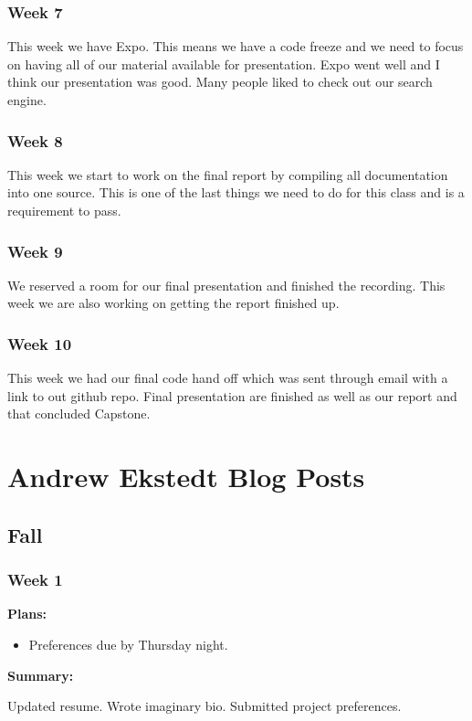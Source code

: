 \subsubsection{Week 7}
This week we have Expo. This means we have a code freeze and we need to focus on having all of our material available for presentation. Expo went well and I think our presentation was good. Many people liked to check out our search engine.
\subsubsection{Week 8}
This week we start to work on the final report by compiling all documentation into one source. This is one of the last things we need to do for this class and is a requirement to pass.
\subsubsection{Week 9}
We reserved a room for our final presentation and finished the recording. This week we are also working on getting the report finished up.
\subsubsection{Week 10}
This week we had our final code hand off which was sent through email with a link to out github repo. Final presentation are finished as well as our report and that concluded Capstone.
\section{ Andrew Ekstedt Blog Posts }

\subsection{Fall}

\subsubsection{Week 1}

\noindent \textbf{Plans:}
\begin{itemize}
\item Preferences due by Thursday night.
\end{itemize}

\noindent \textbf{Summary:}

Updated resume. Wrote imaginary bio.
Submitted project preferences.

